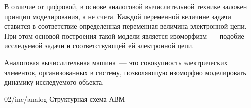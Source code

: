 В отличие от цифровой, в основе аналоговой вычислительной технике заложен принцип моделирования, а не счета. Каждой переменной величине задачи ставится в соответствие определенная переменная величина электронной цепи. При этом основой построения такой модели является изоморфизм~--- подобие исследуемой задачи и соответствующей ей электронной цепи.

\begin{dd}
    Аналоговая вычислительная машина~--- это совокупность электрических элементов, организованных в систему, позволяющую изоморфно моделировать динамику исследуемого объекта.
\end{dd}

\image
{\textwidth}
{02/inc/analog}
{Структурная схема АВМ}